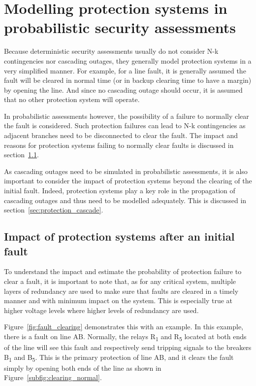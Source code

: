 \section{Modelling protection systems in probabilistic security assessments}
\label{sec:FMEA}

Because deterministic security assessments usually do not consider N-k contingencies nor cascading outages, they generally model protection systems in a very simplified manner. For example, for a line fault, it is generally assumed the fault will be cleared in normal time (or in backup clearing time to have a margin) by opening the line. And since no cascading outage should occur, it is assumed that no other protection system will operate.

In probabilistic assessments however, the possibility of a failure to normally clear the fault is considered. Such protection failures can lead to N-k contingencies as adjacent branches need to be disconnected to clear the fault. The impact and reasons for protection systems failing to normally clear faults is discussed in section~\ref{sec:protection_clearing}.

As cascading outages need to be simulated in probabilistic assessments, it is also important to consider the impact of protection systems beyond the clearing of the initial fault. Indeed, protection systems play a key role in the propagation of cascading outages and thus need to be modelled adequately. This is discussed in section~\ref{sec:protection_cascade}.


\subsection{Impact of protection systems after an initial fault}
\label{sec:protection_clearing}

To understand the impact and estimate the probability of protection failure to clear a fault, it is important to note that, as for any critical system, multiple layers of redundancy are used to make sure that faults are cleared in a timely manner and with minimum impact on the system. This is especially true at higher voltage levels where higher levels of redundancy are used.

Figure~\ref{fig:fault_clearing} demonstrates this with an example. In this example, there is a fault on line AB. Normally, the relays R\textsubscript{1} and R\textsubscript{5} located at both ends of the line will see this fault and respectively send tripping signals to the breakers B\textsubscript{1} and B\textsubscript{5}. This is the primary protection of line AB, and it clears the fault simply by opening both ends of the line as shown in Figure~\ref{subfig:clearing_normal}.


